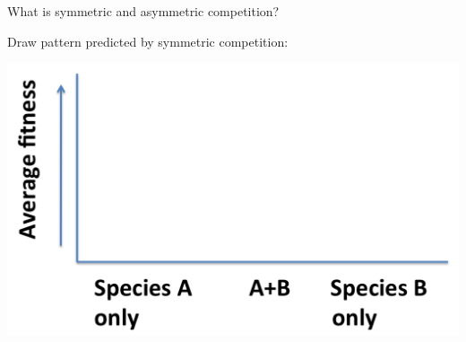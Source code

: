 \begin{frame}[t]
    \begin{adjustwidth}{-2em}{-1.5em}
        \vspace{-3mm}
        What is symmetric and asymmetric competition?

        \vspace{2mm}
        Draw pattern predicted by symmetric competition:
        \begin{center}
        \includegraphics[height=0.65\textheight]{competition-average-fitness.png}
        \end{center}



    \end{adjustwidth}
\end{frame}

